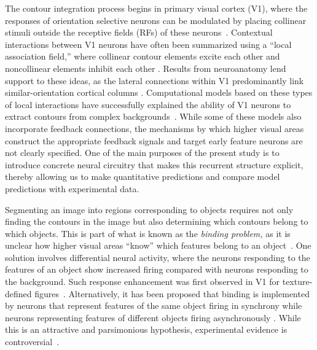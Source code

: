 The contour integration process begins in primary visual cortex (V1),
where the responses of orientation selective neurons can be modulated
by placing collinear stimuli outside the receptive fields (RFs) of
these neurons~\citep{Stemmler_etal95a,Polat_etal98}.  Contextual
interactions between V1 neurons have often been summarized using a
``local association field,'' where collinear contour elements excite
each other and noncollinear elements inhibit each other
\citep{Ullman92, Field_etal93}.  Results from neuroanatomy lend
support to these ideas, as the lateral connections within V1
predominantly link similar-orientation cortical columns
\citep{Gilbert_Wiesel89,Bosking_etal97,
  Stettler_etal02}. Computational models based on these types of local
interactions have successfully explained the ability of V1 neurons to
extract contours from complex
backgrounds~\citep{Li98,Yen_Finkel98,Piech_etal13}. While some of
these models also incorporate feedback
connections, the mechanisms by which higher visual areas construct the
appropriate feedback signals and target early feature neurons are not
clearly specified.  One of the main purposes of the present study is
to introduce concrete neural circuitry that makes this recurrent
structure explicit, thereby allowing us to make quantitative
predictions and compare model predictions with experimental data.

Segmenting an image into regions corresponding to objects requires not only finding the contours in the image but also determining which contours belong to which objects.
This is part of what is known as the {\em binding problem,} as it is unclear how higher visual areas ``know'' which features belong to an object~\citep{Treisman96b}.
One solution involves differential
neural activity, where the neurons responding to the features of an
object show increased firing compared with neurons responding to the
background.  Such response enhancement was first observed in V1 for texture-defined
figures~\citep{Lamme95}. Alternatively, it has been proposed that
binding is implemented by neurons that represent features of the same
object firing in synchrony while neurons representing features of
different objects firing asynchronously \cite[``binding by
synchrony;'' for review see][]{Singer99b}. While this is an attractive
and parsimonious hypothesis, experimental evidence is
controversial~\citep{Gray_etal89,Kreiter_Singer92,DeOliveira_etal97,Thiele_Stoner03,Roelfsema_etal04,Dong_etal08a}.

